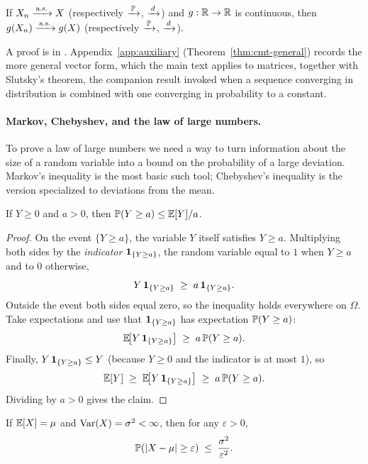 \begin{proposition}\label{prop:cmt}
If \(X_n \xrightarrow{\,\text{a.s.}\,} X\) (respectively \(\xrightarrow{\,\mathbb{P}\,}\), \(\xrightarrow{\,d\,}\)) and \(g: \mathbb{R} \to \mathbb{R}\) is continuous, then \(g(X_n) \xrightarrow{\,\text{a.s.}\,} g(X)\) (respectively \(\xrightarrow{\,\mathbb{P}\,}\), \(\xrightarrow{\,d\,}\)).
\end{proposition}

A proof is in \citet[][\S~5.5]{Casella2002}. Appendix~\ref{app:auxiliary} (Theorem~\ref{thm:cmt-general}) records the more general vector form, which the main text applies to matrices, together with Slutsky's theorem, the companion result invoked when a sequence converging in distribution is combined with one converging in probability to a constant.

\paragraph{Markov, Chebyshev, and the law of large numbers.}
To prove a law of large numbers we need a way to turn information about the size of a random variable into a bound on the probability of a large deviation. Markov's inequality is the most basic such tool; Chebyshev's inequality is the version specialized to deviations from the mean.

\begin{theorem}\label{thm:markov}
If \(Y \ge 0\) and \(a > 0\), then \(\mathbb{P}(Y \ge a) \le \mathbb{E}[Y]/a\).
\end{theorem}

\begin{proof}
On the event \(\{Y \ge a\}\), the variable \(Y\) itself satisfies \(Y \ge a\). Multiplying both sides by the \emph{indicator} \(\mathbf{1}_{\{Y \ge a\}}\), the random variable equal to \(1\) when \(Y \ge a\) and to \(0\) otherwise,
\[
  Y\, \mathbf{1}_{\{Y \ge a\}} \;\ge\; a\, \mathbf{1}_{\{Y \ge a\}}.
\]
Outside the event both sides equal zero, so the inequality holds everywhere on \(\Omega\). Take expectations and use that \(\mathbf{1}_{\{Y \ge a\}}\) has expectation \(\mathbb{P}(Y \ge a)\):
\[
  \mathbb{E}\!\bigl[Y\, \mathbf{1}_{\{Y \ge a\}}\bigr] \;\ge\; a\, \mathbb{P}(Y \ge a).
\]
Finally, \(Y\, \mathbf{1}_{\{Y \ge a\}} \le Y\) (because \(Y \ge 0\) and the indicator is at most \(1\)), so
\[
  \mathbb{E}[Y] \;\ge\; \mathbb{E}\!\bigl[Y\, \mathbf{1}_{\{Y \ge a\}}\bigr] \;\ge\; a\, \mathbb{P}(Y \ge a).
\]
Dividing by \(a > 0\) gives the claim.
\end{proof}

\begin{theorem}\label{thm:chebyshev}
If \(\mathbb{E}[X] = \mu\) and \(\operatorname{Var}(X) = \sigma^2 < \infty\), then for any \(\varepsilon > 0\),
\[
  \mathbb{P}(\lvert X - \mu\rvert \ge \varepsilon) \;\le\; \frac{\sigma^2}{\varepsilon^2}.
\]
\end{theorem}

